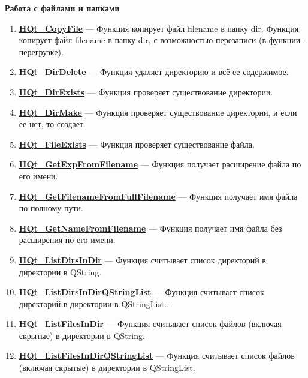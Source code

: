 \documentclass[a4paper,12pt]{article}
\begin{document}
\textbf{Работа с файлами и папками}
\begin{enumerate}

\item \textbf{\hyperref[HQt_CopyFile]{HQt\_CopyFile}} --- Функция копирует файл filename в папку dir. Функция копирует файл filename в папку dir, с возможностью перезаписи (в функции-перегрузке).

\item \textbf{\hyperref[HQt_DirDelete]{HQt\_DirDelete}} --- Функция удаляет директорию и всё ее содержимое.

\item \textbf{\hyperref[HQt_DirExists]{HQt\_DirExists}} --- Функция проверяет существование директории.

\item \textbf{\hyperref[HQt_DirMake]{HQt\_DirMake}} --- Функция проверяет существование директории, и если ее нет, то создает.

\item \textbf{\hyperref[HQt_FileExists]{HQt\_FileExists}} --- Функция проверяет существование файла.

\item \textbf{\hyperref[HQt_GetExpFromFilename]{HQt\_GetExpFromFilename}} --- Функция получает расширение файла по его имени.

\item \textbf{\hyperref[HQt_GetFilenameFromFullFilename]{HQt\_GetFilenameFromFullFilename}} --- Функция получает имя файла по полному пути.

\item \textbf{\hyperref[HQt_GetNameFromFilename]{HQt\_GetNameFromFilename}} --- Функция получает имя файла без расширения по его имени.

\item \textbf{\hyperref[HQt_ListDirsInDir]{HQt\_ListDirsInDir}} --- Функция считывает список директорий в директории в QString.

\item \textbf{\hyperref[HQt_ListDirsInDirQStringList]{HQt\_ListDirsInDirQStringList}} --- Функция считывает список директорий в директории в QStringList..

\item \textbf{\hyperref[HQt_ListFilesInDir]{HQt\_ListFilesInDir}} --- Функция считывает список файлов (включая скрытые) в директории в QString.

\item \textbf{\hyperref[HQt_ListFilesInDirQStringList]{HQt\_ListFilesInDirQStringList}} --- Функция считывает список файлов (включая скрытые) в директории в QStringList.


\end{enumerate}
\end{document}
